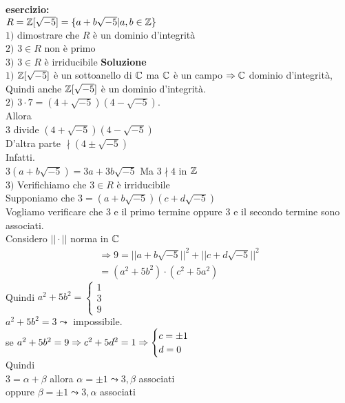 \documentclass[12px]{article}
\begin{document}
\textbf{esercizio:}\\
$R = \mathbb{Z}[\sqrt{-5}] = \{a + b\sqrt{-5} | a,b\in\mathbb{Z}\}$\\
$1)$ dimostrare che  $R$ è un dominio d'integrità\\
$2)$  $3\in R$ non è primo\\
$ 3)$  $3\in R$ è irriducibile
\textbf{Soluzione}\\
$ 1)$  $\mathbb{Z}[\sqrt{-5}]$ è un sottoanello di $\mathbb{C}$ ma  $\mathbb{C}$ è un campo  $ \Rightarrow \mathbb{C}$ dominio d'integrità,\\
Quindi anche $\mathbb{Z}[\sqrt{-5}]$ è un dominio d'integrità.\\
$ 2)$  $3\cdot 7 = (4 + \sqrt{-5})(4 - \sqrt{-5})$.\\
Allora\\
$3$ divide $(4 + \sqrt{-5})(4 - \sqrt{-5})$ \\
D'altra parte $\nmid (4 \pm\sqrt{-5})$\\
Infatti.\\
$3(a + b\sqrt{-5}) = 3a + 3b\sqrt{-5}$ Ma  $3\nmid 4$ in  $\mathbb{Z}$ \\
$3)$ Verifichiamo che $3\in R$ è irriducibile\\
Supponiamo che  $3 = (a+b\sqrt{-5})(c + d\sqrt{-5})$\\
Vogliamo verificare che  $3$ e il primo termine oppure $3$ e il secondo termine sono associati.\\
Considero $||\cdot || $ norma in $\mathbb{C}$\\
\begin{gather*}
	 \Rightarrow  9 = ||a + b\sqrt{-5}||^2 + ||c + d\sqrt{-5}||^2\\
	 = (a^2 + 5b^2)\cdot (c^2 + 5a^2)
\end{gather*}
Quindi $a^2 + 5b^2 = \begin{cases}
	1\\3\\9
\end{cases}$\\
$ a^2 + 5b^2 = 3 \leadsto $ impossibile.\\
se $a^2 +  5b^2 = 9 \\\Rightarrow c^2 + 5d^2 = 1 \Rightarrow \begin{cases}
	c = \pm 1 \\ d = 0
\end{cases}$ \\
Quindi\\
$3 = \alpha +\beta$ allora  $\alpha = \pm 1 \leadsto 3,\beta$ associati\\
oppure  $\beta = \pm 1 \leadsto 3,\alpha$  associati
\end{document}
